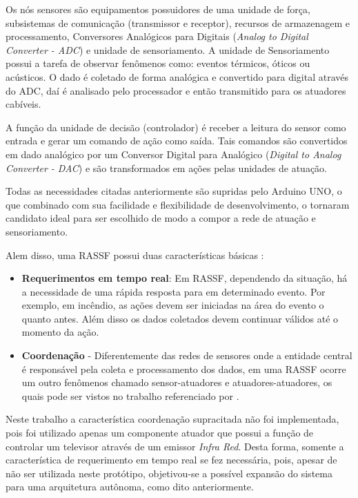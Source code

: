 \documentclass[12pt,a4paper,oneside]{report}
\begin{document}
Os nós sensores são equipamentos possuidores de uma unidade de força, subsistemas de comunicação (transmissor e receptor), recursos de armazenagem e processamento, Conversores Analógicos para Digitais (\emph{Analog to Digital Converter - ADC}) e unidade de sensoriamento. A unidade de Sensoriamento possui a tarefa de observar fenômenos como: eventos térmicos, óticos ou acústicos. O dado é coletado de forma analógica e convertido para digital através do ADC, daí é analisado pelo processador e então transmitido para os atuadores cabíveis.

A função da unidade de decisão (controlador) é receber a leitura do sensor como entrada e gerar um comando de ação como saída. Tais comandos são convertidos em dado analógico por um Conversor Digital para Analógico (\emph{Digital to Analog Converter - DAC}) e são transformados em ações pelas unidades de atuação.

Todas as necessidades citadas anteriormente são supridas pelo Arduino UNO, o que combinado com sua facilidade e flexibilidade de desenvolvimento, o tornaram candidato ideal para ser escolhido de modo a compor a rede de atuação e sensoriamento.

Alem disso, uma RASSF possui duas características básicas \cite{wsaniais}:
\begin{itemize}
    \item \textbf{Requerimentos em tempo real}: Em RASSF, dependendo da situação, há a necessidade de uma rápida resposta para em determinado evento. Por exemplo, em incêndio, as ações devem ser iniciadas na área do evento o quanto antes. Além disso os dados coletados devem continuar válidos até o momento da ação.
    \item \textbf{Coordenação} - Diferentemente das redes de sensores onde a entidade central é responsável pela coleta e processamento dos dados, em  uma RASSF ocorre um outro fenômenos chamado sensor-atuadores e atuadores-atuadores, os quais pode ser vistos no trabalho referenciado por \cite{wsaniais}.
\end{itemize}

Neste trabalho a característica coordenação supracitada não foi implementada, pois foi utilizado apenas um componente atuador que possui a função de controlar um televisor através de um emissor \emph{Infra Red}. Desta forma, somente a característica de requerimento em tempo real se fez necessária, pois, apesar de não ser utilizada neste protótipo, objetivou-se a possível expansão do sistema para uma arquitetura autônoma, como dito anteriormente.
\end{document}

